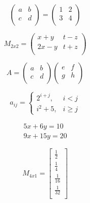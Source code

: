 \documentclass[12pt,a4paper, oneside]{book}
\begin{document}
\begin{equation}
\left(
\begin{array}{lr}
    a & b \\    
    c & d \\
\end{array}
\right) = \left( \begin{array}{lr}
	1 & 2 \\    
    3 & 4 \\
\end{array}
\right)
\end{equation}

\begin{equation}
M_{2x2} = \left(
\begin{array}{lr}
    x+y & t-z \\    
    2x-y & t+z \\
\end{array}
\right)
\end{equation}

\begin{equation}
A = \left(
\begin{array}{lr}
    a & b \\    
    c & d \\
\end{array}
\right) \left(
\begin{array}{lr}
    e & f \\    
    g & h \\
\end{array}
\right)
\end{equation}

\begin{equation}
a_{ij} = \left\lbrace
\begin{array}{cc}
   2^{i+j}, & i < j \\
   i^2 + 5, & i \geq j
\end{array}
\right.
\end{equation}

\begin{eqnarray}
5x + 6y = 10 \\
9x + 15y = 20
\end{eqnarray}

\begin{equation}
M_{4x1} = \left[
\begin{array}{c}
	\frac{1}{2}\\
	\frac{1}{4}\\
	\frac{1}{16}\\
	\frac{1}{32}\\
\end{array}
\right]
\end{equation}
\end{document}
